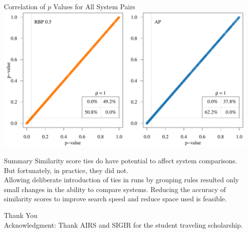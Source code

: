 \documentclass{beamer}
\begin{document}
\begin{frame}{Correlation of $p$ Values for All System Pairs}
\includegraphics[width=0.98\textwidth, page=11]{figs/p_scatter_for_talk.pdf}
\end{frame}

\begin{frame}{Summary}
Similarity score {\color{blue}ties} do have {\color{blue}potential} to affect system comparisons. But fortunately, {\color{blue}in practice}, they {\color{blue}did not}.\\[1.5em]

Allowing {\color{blue}deliberate introduction} of {\color{blue}ties} in runs by grouping rules resulted only {\color{blue}small changes} in the ability to {\color{blue}compare systems}. Reducing the accuracy of similarity scores to improve search speed and reduce space used is feasible.


\end{frame}

\begin{frame}{Thank You}
\\[5em]
\small{Acknowledgment: Thank AIRS and SIGIR for the student traveling scholarship.}
\end{frame} 
\end{document}
